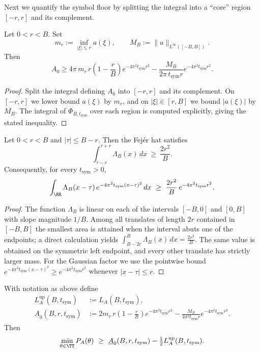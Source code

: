 Next we quantify the symbol floor by splitting the integral into a ``core'' region $[-r,r]$ and its complement.

\begin{lemma}\label{lem:a3-core-lower-bound}
Let $0<r<B$. Set
\[
  m_r := \inf_{|\xi|\le r} a(\xi),\qquad
  M_B := \|a\|_{L^\infty([-B,B])}.
\]
Then
\[
  A_0 \ge 4\pi\,m_r\,r\left(1-\frac{r}{B}\right) e^{-4\pi^2 t_{\mathrm{sym}} r^2}
        - \frac{M_B}{2\pi\,t_{\mathrm{sym}} r} e^{-4\pi^2 t_{\mathrm{sym}} r^2}.
\]
\end{lemma}

\begin{proof}
Split the integral defining $A_0$ into $[-r,r]$ and its complement. On $[-r,r]$ we lower bound $a(\xi)$ by $m_r$, and on $|\xi|\in[r,B]$ we bound $|a(\xi)|$ by $M_B$. The integral of $\Phi_{B,t_{\mathrm{sym}}}$ over each region is computed explicitly, giving the stated inequality.
\end{proof}

\begin{lemma}\label{lem:a3-core-shift}
Let $0<r<B$ and $|\tau|\le B-r$. Then the Fej\'er hat satisfies
\[
  \int_{\tau-r}^{\tau+r} \Lambda_B(x)\,dx\ \ge\ \frac{2r^2}{B}.
\]
Consequently, for every $t_{\mathrm{sym}}>0$,
\[
  \int_{\RR} \Lambda_B(x-\tau)\,e^{-4\pi^2 t_{\mathrm{sym}}(x-\tau)^2}\,dx
  \ \ge\ \frac{2r^2}{B}\,e^{-4\pi^2 t_{\mathrm{sym}} r^2}.
\]
\end{lemma}

\begin{proof}
The function $\Lambda_B$ is linear on each of the intervals $[-B,0]$ and $[0,B]$ with slope magnitude $1/B$. Among all translates of length $2r$ contained in $[-B,B]$ the smallest area is attained when the interval abuts one of the endpoints; a direct calculation yields
\(
\int_{B-2r}^{B}\Lambda_B(x)\,dx = \frac{2r^2}{B}.
\)
The same value is obtained on the symmetric left endpoint, and every other translate has strictly larger mass. For the Gaussian factor we use the pointwise bound $e^{-4\pi^2 t_{\mathrm{sym}}(x-\tau)^2}\ge e^{-4\pi^2 t_{\mathrm{sym}} r^2}$ whenever $|x-\tau|\le r$.
\end{proof}

\begin{lemma}\label{lem:a3-arch-floor}
With notation as above define
\[
\begin{aligned}
  L_A^{\mathrm{up}}(B,t_{\mathrm{sym}}) &:= L_A(B,t_{\mathrm{sym}}), \\
  \underline{A}_0(B,r,t_{\mathrm{sym}})
    &:= 2 m_r\,r\left(1-\frac{r}{B}\right) e^{-4\pi^2 t_{\mathrm{sym}} r^2}
       - \frac{M_B}{4\pi^2 t_{\mathrm{sym}} r} e^{-4\pi^2 t_{\mathrm{sym}} r^2}.
\end{aligned}
\]
Then
\[
  \min_{\theta\in\TT} P_A(\theta)\ \ge\ \underline{A}_0(B,r,t_{\mathrm{sym}}) - \tfrac12 L_A^{\mathrm{up}}(B,t_{\mathrm{sym}}).
\]
\end{lemma}

